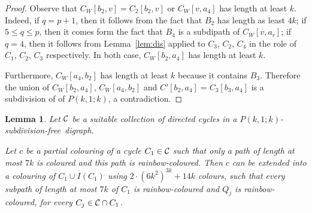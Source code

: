 \documentclass[utf8,10pt]{article}
\theoremstyle{plain}
\newtheorem{lemma}[theorem]{Lemma}
\theoremstyle{definition}
\theoremstyle{remark}
\newcommand{\col}{(6k^2)^{3k}}
\newcommand{\free}{subdivision-free}
\begin{document}
\begin{proof}
Observe that $C_W[b_2,v]=C_2[b_2,v]$ or $C_W[v, a_4]$ has length at least $k$.
Indeed, if $q=p+1$, then it follows from the fact that $B_2$ has length as least $4k$; if
$5\leq q\leq p$, then it comes form the fact that $B_4$ is a subdipath of $C_W[v, a_r]$; if $q=4$, then it follows from Lemma~\ref{lem:dis}  applied to $C_3$, $C_2$, $C_4$ in the role of $C_1$, $C_2$, $C_3$ respectively.
In both case, $C_W[b_2, a_4]$ has length at least $k$. 

Furthermore, $C_W[a_4,b_2]$ has length at least $k$ because it contains $B_3$. Therefore the union of
$C_W[b_2, a_4]$, $C_W[a_4,b_2]$ and $C'[b_2,a_4]=C_3[b_3,a_4]$ is a subdivision of of $P(k,1;k)$, a contradiction.
\end{proof}




\begin{lemma}\label{lem:IC}
Let ${\cal C}$ be a suitable collection of directed cycles in a $P(k,1;k)$-\free\ digraph.

Let $c$ be a partial colouring of a cycle $C_1\in {\cal C}$ such that only a path of length at most
$7k$ is coloured and this path is rainbow-coloured. Then $c$ can be extended into
a colouring of $C_1\cup I(C_1)$ using $2\cdot \col + 14k$ colours, such that every subpath of length at most $7k$ of $C_1$ is rainbow-coloured and  $Q_j$ is rainbow-coloured, for every $C_j\in {\cal C}\cap C_1$.\end{lemma}
\end{document}
